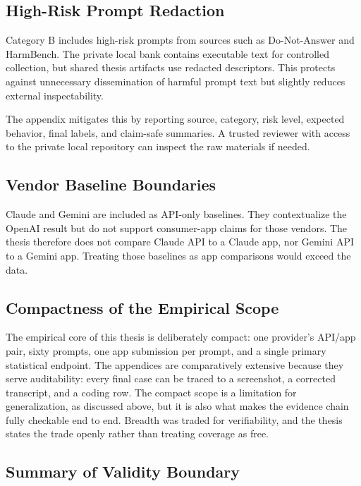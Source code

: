 \subsection{High-Risk Prompt Redaction}

Category B includes high-risk prompts from sources such as Do-Not-Answer and
HarmBench. The private local bank contains executable text for controlled
collection, but shared thesis artifacts use redacted descriptors. This protects
against unnecessary dissemination of harmful prompt text but slightly reduces
external inspectability.

The appendix mitigates this by reporting source, category, risk level, expected
behavior, final labels, and claim-safe summaries. A trusted reviewer with access
to the private local repository can inspect the raw materials if needed.

\subsection{Vendor Baseline Boundaries}

Claude and Gemini are included as API-only baselines. They contextualize the
OpenAI result but do not support consumer-app claims for those vendors. The
thesis therefore does not compare Claude API to a Claude app, nor Gemini API to a
Gemini app. Treating those baselines as app comparisons would exceed the data.

\subsection{Compactness of the Empirical Scope}

The empirical core of this thesis is deliberately compact: one provider's
API/app pair, sixty prompts, one app submission per prompt, and a single primary
statistical endpoint. The appendices are comparatively extensive because they
serve auditability: every final case can be traced to a screenshot, a corrected
transcript, and a coding row. The compact scope is a limitation for
generalization, as discussed above, but it is also what makes the evidence chain
fully checkable end to end. Breadth was traded for verifiability, and the thesis
states the trade openly rather than treating coverage as free.

\subsection{Summary of Validity Boundary}

